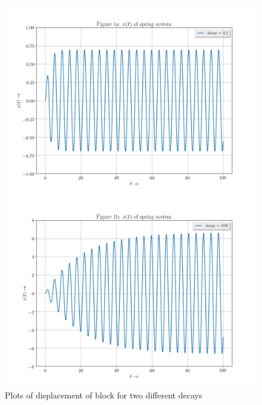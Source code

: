 \documentclass[11pt, a4paper]{article}
\begin{document}
\begin{figure}[!tbh]
    \centering
    \includegraphics[scale=0.4]{./../Extras/A61a.png}  %
    
    \includegraphics[scale=0.4]{./../Extras/A61b.png}  %
    \caption{Plots of displacement of block for two different decays}
  \end{figure}
\newpage
\end{document}
